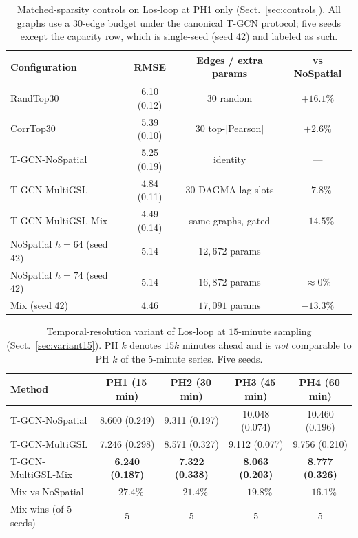 \begin{table}[t]
\centering
\caption{Matched-sparsity controls on Los-loop at PH1 only
(Sect.~\ref{sec:controls}). All graphs use a $30$-edge budget under the
canonical T-GCN protocol; five seeds except the capacity row, which is
single-seed (seed 42) and labeled as such.}
\label{tab:controls}
\small
\begin{tabular}{lccc}
\toprule
Configuration & RMSE & Edges / extra params & vs NoSpatial \\
\midrule
RandTop30 & 6.10 (0.12) & 30 random & $+16.1\%$ \\
CorrTop30 & 5.39 (0.10) & 30 top-$|$Pearson$|$ & $+2.6\%$ \\
T-GCN-NoSpatial & 5.25 (0.19) & identity & --- \\
T-GCN-MultiGSL & 4.84 (0.11) & 30 DAGMA lag slots & $-7.8\%$ \\
T-GCN-MultiGSL-Mix & 4.49 (0.14) & same graphs, gated & $-14.5\%$ \\
\midrule
NoSpatial $h{=}64$ (seed 42) & 5.14 & $12{,}672$ params & --- \\
NoSpatial $h{=}74$ (seed 42) & 5.14 & $16{,}872$ params & $\approx 0\%$ \\
Mix (seed 42) & 4.46 & $17{,}091$ params & $-13.3\%$ \\
\bottomrule
\end{tabular}
\end{table}

\begin{table}[t]
\centering
\caption{Temporal-resolution variant of Los-loop at $15$-minute sampling
(Sect.~\ref{sec:variant15}). PH $k$ denotes $15k$ minutes ahead and is
\emph{not} comparable to PH $k$ of the $5$-minute series. Five seeds.}
\label{tab:los15}
\small
\begin{tabular}{lcccc}
\toprule
Method & PH1 (15\,min) & PH2 (30\,min) & PH3 (45\,min) & PH4 (60\,min) \\
\midrule
T-GCN-NoSpatial & 8.600 (0.249) & 9.311 (0.197) & 10.048 (0.074) & 10.460 (0.196) \\
T-GCN-MultiGSL & 7.246 (0.298) & 8.571 (0.327) & 9.112 (0.077) & 9.756 (0.210) \\
T-GCN-MultiGSL-Mix & \textbf{6.240 (0.187)} & \textbf{7.322 (0.338)} & \textbf{8.063 (0.203)} & \textbf{8.777 (0.326)} \\
\midrule
Mix vs NoSpatial & $-27.4\%$ & $-21.4\%$ & $-19.8\%$ & $-16.1\%$ \\
Mix wins (of 5 seeds) & 5 & 5 & 5 & 5 \\
\bottomrule
\end{tabular}
\end{table}

